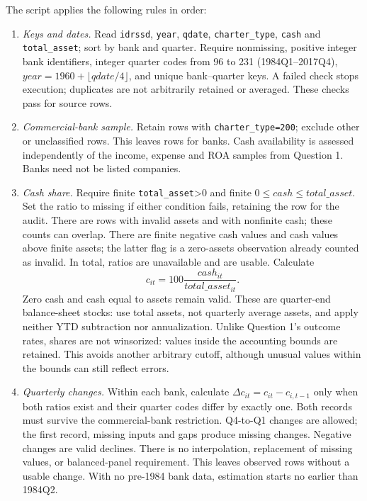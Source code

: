 \documentclass[10pt]{article}
\begin{document}
The script applies the following rules in order:
\begin{enumerate}
\item \textit{Keys and dates.} Read \texttt{idrssd}, \texttt{year}, \texttt{qdate}, \texttt{charter\_type}, \texttt{cash} and \texttt{total\_asset}; sort by bank and quarter. Require nonmissing, positive integer bank identifiers, integer quarter codes from 96 to 231 (1984Q1--2017Q4), \(year=1960+\lfloor qdate/4\rfloor\), and unique bank--quarter keys. A failed check stops execution; duplicates are not arbitrarily retained or averaged. These checks pass for \QTwoRawRows{} source rows.

\item \textit{Commercial-bank sample.} Retain rows with \texttt{charter\_type=200}; exclude \QTwoOtherCharterRows{} other or unclassified rows. This leaves \QTwoPanelRows{} rows for \QTwoPanelBanks{} banks. Cash availability is assessed independently of the income, expense and ROA samples from Question 1. Banks need not be listed companies.

\item \textit{Cash share.} Require finite \texttt{total\_asset}>0 and finite \(0\leq cash\leq total\_asset\). Set the ratio to missing if either condition fails, retaining the row for the audit. There are \QTwoInvalidAssetRows{} rows with invalid assets and \QTwoNonfiniteCashRows{} with nonfinite cash; these counts can overlap. There are \QTwoNegativeCashRows{} finite negative cash values and \QTwoCashAboveAssetsRows{} cash values above finite assets; the latter flag is a zero-assets observation already counted as invalid. In total, \QTwoInvalidRatioRows{} ratios are unavailable and \QTwoValidRatioRows{} are usable. Calculate
\[
 c_{it}=100\frac{cash_{it}}{total\_asset_{it}}.
\]
Zero cash and cash equal to assets remain valid. These are quarter-end balance-sheet stocks: use total assets, not quarterly average assets, and apply neither YTD subtraction nor annualization. Unlike Question 1's outcome rates, shares are not winsorized: values inside the accounting bounds are retained. This avoids another arbitrary cutoff, although unusual values within the bounds can still reflect errors.

\item \textit{Quarterly changes.} Within each bank, calculate \(\Delta c_{it}=c_{it}-c_{i,t-1}\) only when both ratios exist and their quarter codes differ by exactly one. Both records must survive the commercial-bank restriction. Q4-to-Q1 changes are allowed; the first record, missing inputs and gaps produce missing changes. Negative changes are valid declines. There is no interpolation, replacement of missing values, or balanced-panel requirement. This leaves \QTwoUnavailableDiffRows{} observed rows without a usable change. With no pre-1984 bank data, estimation starts no earlier than 1984Q2.


\end{enumerate}
\end{document}
